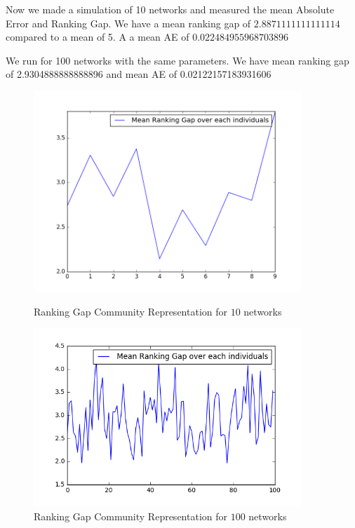 \documentclass[12pt]{ociamthesis}  %
\begin{document}
	Now we made a simulation of 10 networks and measured the mean Absolute Error and Ranking Gap.
	We have a mean ranking gap of $2.8871111111111114$ compared to a mean of 5. A a mean AE of $0.022484955968703896$
	
	We run for 100 networks with the same parameters.
	We have mean ranking gap of 2.9304888888888896 and mean AE of 0.02122157183931606
	\begin{figure}[H]
		\centering
		\begin{minipage}{0.45\textwidth}
			\centering
			\includegraphics[width=0.9\textwidth]{SimulationGap} %
			\caption{Ranking Gap Community Representation for $10$ networks}
			\label{label-image12}
		\end{minipage}\hfill
		\begin{minipage}{0.45\textwidth}
			\centering
			\includegraphics[width=0.9\textwidth]{SimulationGap100} %
			\caption{Ranking Gap Community Representation for $100$ networks}
			\label{label-image13}
		\end{minipage}
	\end{figure}
	
\end{document}

